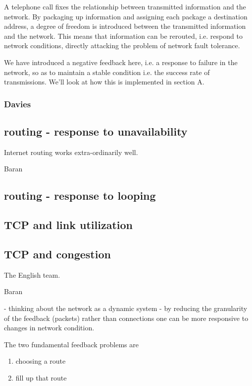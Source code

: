 A telephone call fixes the relationship between transmitted information and the network. By
packaging up information and assigning each package a destination address, a degree of freedom is
introduced between the transmitted information and the network. This means that information can be
rerouted, i.e. respond to network conditions, directly attacking the problem of network fault
tolerance.

We have introduced a negative feedback here, i.e. a response to failure in the network, so as to
maintain a stable condition i.e. the success rate of transmissions. We'll look at how this is
implemented in section A.

\subsubsection{Davies}



\subsection{routing - response to unavailability}

Internet routing works extra-ordinarily well.

Baran

\subsection{routing - response to looping}

\subsection{TCP and link utilization}

\subsection{TCP and congestion}


The English team.

Baran

- thinking about the network as a dynamic system
- by reducing the granularity of the feedback (packets) rather than connections one can be more
  responsive to changes in network condition.


The two fundamental feedback problems are

\begin{enumerate}
    \item choosing a route
    \item fill up that route
\end{enumerate}


